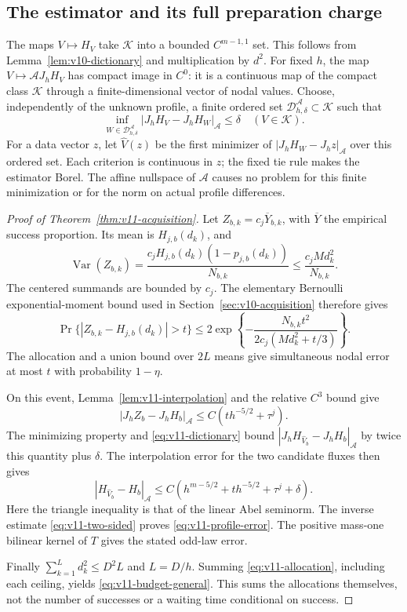 \subsection{The estimator and its full preparation charge}
The maps $V\mapsto H_V$ take $\mathcal K$ into a bounded
$C^{m-1,1}$ set. This follows from
Lemma~\ref{lem:v10-dictionary} and multiplication by $d^2$.
For fixed $h$, the map
$V\mapsto\mathscr A J_hH_V$ has compact image in $C^0$:
it is a continuous map of the compact class $\mathcal K$ through a
finite-dimensional vector of nodal values. Choose, independently of
the unknown profile, a finite ordered set
$\mathcal D^{\mathscr A}_{h,\delta}\subset\mathcal K$ such that
\begin{equation}\label{eq:v11-dictionary}
 \inf_{W\in\mathcal D^{\mathscr A}_{h,\delta}}
               |J_hH_V-J_hH_W|_{\mathscr A}\le\delta
                       \quad(V\in\mathcal K).
\end{equation}
For a data vector $z$, let $\widehat V(z)$ be the first minimizer of
$|J_hH_W-J_hz|_{\mathscr A}$ over this ordered set. Each criterion
is continuous in $z$; the fixed tie rule makes the estimator Borel.
The affine nullspace of $\mathscr A$ causes no problem for this
finite minimization or for the norm on actual profile differences.

\begin{proof}[Proof of Theorem~\ref{thm:v11-acquisition}]
Let $Z_{b,k}=c_j\overline Y_{b,k}$, with $\overline Y$ the empirical
success proportion. Its mean is $H_{j,b}(d_k)$, and
\[
 \operatorname{Var}(Z_{b,k})
    =\frac{c_jH_{j,b}(d_k)(1-p_{j,b}(d_k))}{N_{b,k}}
    \le\frac{c_jMd_k^2}{N_{b,k}}.
\]
The centered summands are bounded by $c_j$. The elementary Bernoulli
exponential-moment bound used in Section~\ref{sec:v10-acquisition}
therefore gives
\[
 \Pr\{|Z_{b,k}-H_{j,b}(d_k)|>t\}
 \le2\exp\left\{-\frac{N_{b,k}t^2}
                         {2c_j(Md_k^2+t/3)}\right\}.
\]
The allocation and a union bound over $2L$ means give simultaneous
nodal error at most $t$ with probability $1-\eta$.

On this event, Lemma~\ref{lem:v11-interpolation} and the relative
$C^3$ bound give
\[
 |J_hZ_b-J_hH_b|_{\mathscr A}
                    \le C(t h^{-5/2}+\tau^j).
\]
The minimizing property and \eqref{eq:v11-dictionary} bound
$|J_hH_{\widehat V_b}-J_hH_b|_{\mathscr A}$ by twice this
quantity plus $\delta$. The interpolation error for the two
candidate fluxes then gives
\[
 |H_{\widehat V_b}-H_b|_{\mathscr A}
       \le C(h^{m-5/2}+t h^{-5/2}+\tau^j+\delta).
\]
Here the triangle inequality is that of the linear Abel seminorm.
The inverse estimate \eqref{eq:v11-two-sided} proves
\eqref{eq:v11-profile-error}. The positive mass-one bilinear kernel
of $T$ gives the stated odd-law error.

Finally $\sum_{k=1}^L d_k^2\le D^2L$ and $L=D/h$.
Summing \eqref{eq:v11-allocation}, including each ceiling, yields
\eqref{eq:v11-budget-general}. This sums the allocations themselves,
not the number of successes or a waiting time conditional on success.
\end{proof}

